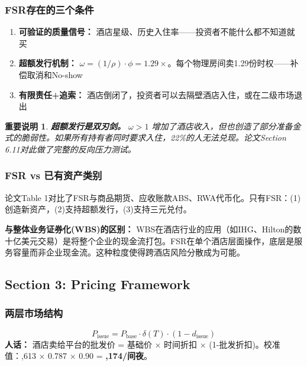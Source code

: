 \documentclass[12pt,a4paper]{ctexart}
\newtheorem{warning}{重要说明}
\begin{document}
\subsubsection{FSR存在的三个条件}

\begin{enumerate}[nosep]
    \item \textbf{可验证的质量信号：} 酒店星级、历史入住率——投资者不能什么都不知道就买
    \item \textbf{超额发行机制：} $\omega = (1/\rho) \cdot \phi = 1.29\times$。每个物理房间卖1.29份时权——补偿取消和No-show
    \item \textbf{有限责任+追索：} 酒店倒闭了，投资者可以去隔壁酒店入住，或在二级市场退出
\end{enumerate}

\begin{warning}
\textbf{超额发行是双刃剑。} $\omega > 1$ 增加了酒店收入，但也创造了部分准备金式的脆弱性。如果所有持有者同时要求入住，22\%的人无法兑现。论文Section 6.11对此做了完整的反向压力测试。
\end{warning}

\subsubsection{FSR vs 已有资产类别}

论文Table 1对比了FSR与商品期货、应收账款ABS、RWA代币化。只有FSR：(1)创造新资产，(2)支持超额发行，(3)支持三元兑付。

\textbf{与整体业务证券化(WBS)的区别：} WBS在酒店行业的应用（如IHG、Hilton的数十亿美元交易）是将整个企业的现金流打包。FSR在单个酒店层面操作，底层是服务容量而非企业现金流。这种粒度使得跨酒店风险分散成为可能。

\subsection{Section 3: Pricing Framework}

\subsubsection{两层市场结构}

\begin{equation}
    P_{\text{issue}} = P_{\text{base}} \cdot \delta(T) \cdot (1 - d_{\text{issue}})
\end{equation}
\textbf{人话：} 酒店卖给平台的批发价 = 基础价 × 时间折扣 × (1-批发折扣)。校准值：,613 × 0.787 × 0.90 = \textbf{,174/间夜}。
\end{document}
